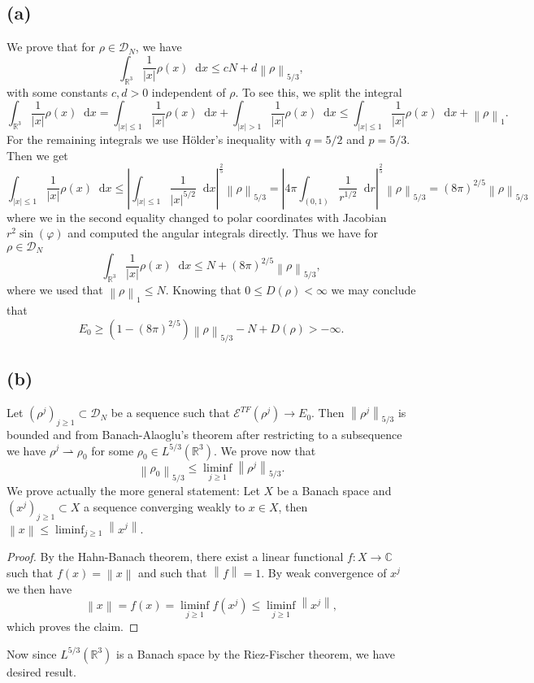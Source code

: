 \documentclass[a4paper,11pt]{article}
\newcommand{\norm}[1]{\left\lVert #1 \right\rVert}
\newcommand{\abs}[1]{\left\lvert #1 \right\rvert}
\newcommand*\diff{\mathop{}\!\mathrm{d}}
\newcommand{\R}{\mathbb{R}}
\newcommand{\C}{\mathbb{C}}
\numberwithin{equation}{section}
\begin{document}
\subsection*{(a)}
We prove that for $ \rho\in \mathcal{D}_N $, we have\begin{equation}
\int_{\R^3}\frac{1}{\abs{x}}\rho(x)\diff x\leq cN+d\norm{\rho}_{5/3},
\end{equation}
with some constants $ c,d>0 $ independent of $ \rho $. To see this, we split the integral\begin{equation}
\int_{\R^3}\frac{1}{\abs{x}}\rho(x)\diff x=\int_{\abs{x}\leq 1}\frac{1}{\abs{x}}\rho(x)\diff x+\int_{\abs{x}>1}\frac{1}{\abs{x}}\rho(x)\diff x\leq\int_{\abs{x}\leq 1}\frac{1}{\abs{x}}\rho(x)\diff x+\norm{\rho}_1.
\end{equation}
For the remaining integrals we use H\"older's inequality with $ q=5/2 $  and $ p=5/3 $. Then we get \begin{equation}
\int_{\abs{x}\leq 1}\frac{1}{\abs{x}}\rho(x)\diff x\leq\abs{\int_{\abs{x}\leq 1}\frac{1}{\abs{x}^{5/2}}\diff x}^{\frac{2}{5}}\norm{\rho}_{5/3}=\abs{4\pi \int_{(0,1)}\frac{1}{r^{1/2}}\diff r}^{\frac{2}{5}}\norm{\rho}_{5/3}=(8\pi)^{2/5}\norm{\rho}_{5/3}
\end{equation}
where we in the second equality changed to polar coordinates with Jacobian $ r^2\sin(\varphi) $ and computed the angular integrals directly. Thus we have for $ \rho\in \mathcal{D}_N $ \begin{equation}
\int_{\R^3}\frac{1}{\abs{x}}\rho(x)\diff x\leq N+(8\pi)^{2/5}\norm{\rho}_{5/3},
\end{equation}
where we used that $ \norm{\rho}_1\leq N $.
Knowing that $ 0\leq D(\rho)<\infty $ we may conclude that \begin{equation}
E_0\geq(1-(8\pi)^{2/5})\norm{\rho}_{5/3}-N+D(\rho)>-\infty.
\end{equation}
\subsection*{(b)}
Let $ (\rho^j)_{j\geq1}\subset \mathcal{D}_N $ be a sequence such that $ \mathcal{E}^{TF}(\rho^j)\to E_0 $. Then $ \norm{\rho^j}_{5/3} $ is bounded and from Banach-Alaoglu's theorem after restricting to a subsequence we have $ \rho^j\rightharpoonup\rho_0 $ for some $ \rho_0\in L^{5/3}(\R^3) $. We prove now that \begin{equation}
\norm{\rho_0}_{5/3}\leq\liminf_{j\geq1}\norm{\rho^j}_{5/3}.
\end{equation}
We prove actually the more general statement: Let $ X $ be a Banach space and $ (x^j)_{j\geq1}\subset X $ a sequence converging weakly to $ x\in X $, then $ \norm{x}\leq\liminf_{j\geq1}\norm{x^j} $.
\begin{proof}
	By the Hahn-Banach theorem, there exist a linear functional $ f:X\to \C $ such that $ f(x)=\norm{x} $ and such that $ \norm{f}=1 $. By weak convergence of $ x^j $ we then have \begin{equation}
	\norm{x}=f(x)=\liminf_{j\geq 1}f(x^j)\leq\liminf_{j\geq1}\norm{x^j},
	\end{equation}
	which proves the claim.
\end{proof}
Now since $ L^{5/3}(\R^3) $ is a Banach space by the Riez-Fischer theorem, we have desired result.
\end{document}
